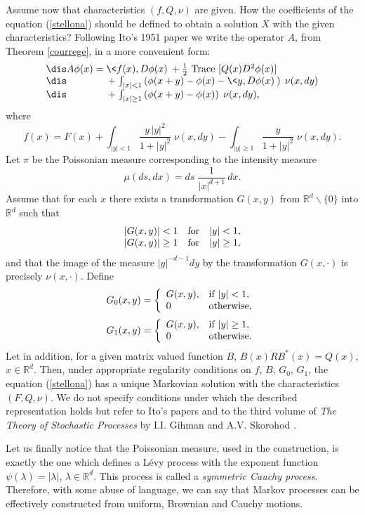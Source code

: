\documentclass[preprint]{imsart}
\def\R{\mathbb R}
\begin{document}
{Assume now that characteristics $(f,Q,\nu)$ are given. How the
coefficients of the equation (\ref{stellona}) should be defined to
obtain a solution $X$ with the given characteristics?
Following Ito's 1951 paper we write the operator $A$, from Theorem \ref{courrege}, in a more
convenient form:
$$\begin{array}{l}\dis
 A\phi(x)= \<f(x),D\phi(x)\> +\frac{1}{2}{\rm \ Trace}\
 [Q(x)D^2\phi(x)]
 \\\dis
 \qquad\qquad+ \int_{|x|<1} \left(
 \phi(x+y)-\phi(x)-\<y,D\phi(x)\> \right)\; \nu(x,dy)
  \\\dis
 \qquad\qquad
 +\int_{|x|\ge1} \left(
 \phi(x+y)-\phi(x) \right)\; \nu(x,dy),
 \end{array}
 $$
where
$$
f(x)= F(x)+
 \int_{|y|<1}\frac{y\,|y|^2}{1+|y|^2}\; \nu(x,dy)
 -\int_{|y|\ge1}\frac{y}{1+|y|^2}\; \nu(x,dy).
$$
Let $\pi$ be the Poissonian measure corresponding to the
intensity measure
$$
\mu(ds,dx)=ds\; \frac{1}{|x|^{d+1}}\,dx.
$$
Assume that for each $x$ there exists a transformation
$G(x,y)$ from $\R^d\backslash \{0\}$ into $\R^d$ such that
$$
\begin{array}{lll}
  |G(x,y)|<1 & {\rm for} & |y|<1, \\
  |G(x,y)|\ge 1 & {\rm for} & |y|\ge1,
\end{array}
$$
and that the image of the measure $|y|^{-d-1}dy$ by the
transformation $G(x,\cdot)$ is precisely $\nu(x,\cdot)$.
Define
$$
G_0(x,y)=\left\{
\begin{array}{ll}
  G(x,y), & {\rm if\;}  |y|< 1, \\
0 & {\rm otherwise},
\end{array}
\right.
$$
$$
G_1(x,y)=\left\{
\begin{array}{ll}
  G(x,y), & {\rm if\;}  |y|\ge 1, \\
0 & {\rm otherwise}.
\end{array}
\right.
$$
Let in addition, for a given matrix valued function $B$,
$B(x)RB^*(x)=Q(x)$, $x\in\R^d$. Then, under appropriate regularity
conditions on $f$, $B$, $G_0$, $G_1$, the equation
(\ref{stellona}) has a unique Markovian solution with the
characteristics $(F, Q, \nu)$.
We do not specify conditions under which the described
representation holds but  refer to  Ito's  papers and to the
third  volume of {\it The Theory of Stochastic Processes} by
I.I. Gihman and A.V. Skorohod \cite{skorochod}.
\vspace{2mm}

\noindent Let us finally notice that the Poissonian measure, used in the
construction, is exactly the one which defines a L\'evy process
with the exponent function $\psi(\lambda)=|\lambda|$,
$\lambda\in\R^d$. This process is called a {\it symmetric Cauchy
process}. Therefore, with some abuse of language, we can say that
Markov processes can be effectively constructed from  uniform,
Brownian and Cauchy motions.


}
\end{document}

